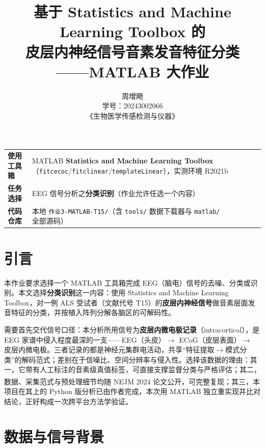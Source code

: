 \documentclass[11pt,a4paper]{ctexart}
\begin{document}
\title{\heiti 基于 Statistics and Machine Learning Toolbox 的\\皮层内神经信号音素发音特征分类\\[4pt] ——MATLAB 大作业}
\author{周增飏\\[2pt]学号：20243002066\\[8pt]\normalsize 《生物医学传感检测与仪器》}
\date{}

\maketitle

\begin{center}\small
\begin{tabular}{@{}p{5em}@{}p{}@{}}
\textbf{使用工具箱} & MATLAB \textbf{Statistics and Machine Learning Toolbox}（\texttt{fitcecoc}/\texttt{fitclinear}/\texttt{templateLinear}），实测环境 R2021b \\
\textbf{任务选择} & EEG 信号分析之\textbf{分类识别}（作业允许任选一个内容） \\
\textbf{代码仓库} & 本地 \texttt{作业3-MATLAB-T15/}（含 \texttt{tools/} 数据下载器与 \texttt{matlab/} 全部源码） \\
\end{tabular}
\end{center}

\section*{引言}

本作业要求选择一个 MATLAB 工具箱完成 EEG（脑电）信号的去噪、分类或识别。本文选择\textbf{分类识别}这一内容：使用 Statistics and Machine Learning Toolbox，对一例 ALS 受试者（文献代号 T15）的\textbf{皮层内神经信号}做音素层面发音特征的分类，并按植入阵列分解各脑区的可解码性。

需要首先交代信号口径：本分析所用信号为\textbf{皮层内微电极记录}（intracortical），是 EEG 家谱中侵入程度最深的一支——EEG（头皮）$\to$ ECoG（皮层表面）$\to$ 皮层内微电极。三者记录的都是神经元集群电活动，共享``特征提取$\to$模式分类''的解码范式；差别在于信噪比、空间分辨率与侵入性。选择该数据的理由：其一，它带有人工标注的音素级真值标签，可直接支撑监督分类与严格评估；其二，数据、采集范式与预处理细节均随 NEJM 2024 论文\textsuperscript{\cite{card2024}}公开，可完整复现；其三，本项目在其上的 Python 版分析已由作者完成，本次用 MATLAB 独立重实现并比对结论，正好构成一次跨平台方法学验证。

\section{数据与信号背景}
\end{document}
